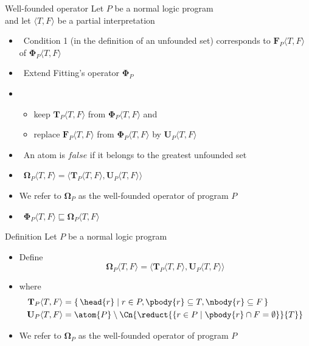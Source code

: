 \begin{frame}{Well-founded operator}
  Let $P$ be a normal logic program\\
  and let $\langle T,F \rangle$ be a partial interpretation
  \medskip
  \begin{itemize}
  \item<2->  \
    Condition 1 (in the definition of an unfounded set)
    corresponds to  ${\mathbf{F}}_P\langle T,F \rangle$
    of ${\mathbf{\Phi}}_P\langle T,F \rangle$
    \medskip
  \item<3->  \
    Extend Fitting's operator $\mathbf{\Phi}_P$
  \item<4-> []
    \begin{itemize}\normalsize
    \item keep    ${\mathbf{T}}_P\langle T,F \rangle$ from ${\mathbf{\Phi}}_P\langle T,F \rangle$ and
    \item replace ${\mathbf{F}}_P\langle T,F \rangle$ from ${\mathbf{\Phi}}_P\langle T,F \rangle$ by
      ${\mathbf{U}}_P\langle T,F \rangle$
    \end{itemize}
    \medskip
  \item<only@5 >  \ An atom is $\mathit{false}$ if it belongs to the greatest unfounded set
  \item<only@7->  \
    \(
    {\mathbf{\Omega}}_P\langle T,F \rangle
    =
    \langle {\mathbf{T}}_P\langle T,F \rangle, {\mathbf{U}}_P\langle T,F \rangle\rangle
    \)
  \item<only@8->[] We refer to ${\mathbf{\Omega}}_P$ as the \alert{well-founded operator} of program $P$
    \smallskip
  \item<only@9->  \
    \(
    {\mathbf{\Phi}}_P  \langle T,F \rangle
    \sqsubseteq
    {\mathbf{\Omega}}_P\langle T,F \rangle
    \)
  \end{itemize}
\end{frame}
\begin{frame}{Definition}
  \bigskip
  Let $P$ be a normal logic program
  \medskip
  \begin{itemize}
  \item Define
    \[
      {\mathbf{\Omega}}_P\langle T,F \rangle
      =
      \langle
      {\mathbf{T}}_P\langle T,F \rangle,
      {\mathbf{U}}_P\langle T,F \rangle
      \rangle
    \]
  \item []
    where
    \begin{align*}
      {\mathbf{T}}_P\langle T,F \rangle
      & =
      \{\, \head{r} \mid r \in P, \pbody{r} \subseteq T, \nbody{r} \subseteq F \,\}
      \\
      {\mathbf{U}}_P\langle T,F \rangle
      & =
      \atom{P} \setminus
      \Cn{\reduct{\{r \in P \mid \pbody{r} \cap F = \emptyset\}}{T}}
    \end{align*}
\item We refer to ${\mathbf{\Omega}}_P$ as the \alert{well-founded operator} of program $P$
\end{itemize}
\end{frame}
